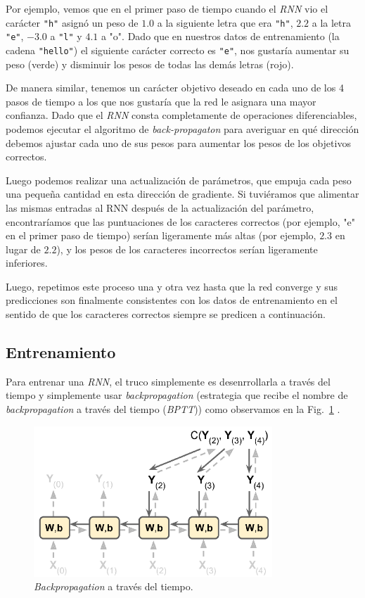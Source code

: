 \documentclass[a4paper,12pt]{article}
\begin{document}
Por ejemplo, vemos que en el primer paso de tiempo cuando el \textit{RNN} vio el carácter \texttt{"h"} asignó un peso de $1.0$ a la siguiente letra que era \texttt{"h"}, $2.2$ a la letra \texttt{"e"}, $-3.0$ a \texttt{"l"} y $4.1$ a "o". Dado que en nuestros datos de entrenamiento (la cadena \texttt{"hello"}) el siguiente carácter correcto es \texttt{"e"}, nos gustaría aumentar su peso (verde) y disminuir los pesos de todas las demás letras (rojo). 

De manera similar, tenemos un carácter objetivo deseado en cada uno de los 4 pasos de tiempo a los que nos gustaría que la red le asignara una mayor confianza. Dado que el \textit{RNN} consta completamente de operaciones diferenciables, podemos ejecutar el algoritmo de \textit{back-propagaton} para averiguar en qué dirección debemos ajustar cada uno de sus pesos para aumentar los pesos de los objetivos correctos. 

Luego podemos realizar una actualización de parámetros, que empuja cada peso una pequeña cantidad en esta dirección de gradiente. Si tuviéramos que alimentar las mismas entradas al RNN después de la actualización del parámetro, encontraríamos que las puntuaciones de los caracteres correctos (por ejemplo, "e" en el primer paso de tiempo) serían ligeramente más altas (por ejemplo, $2.3$ en lugar de $2.2$), y los pesos de los caracteres incorrectos serían ligeramente inferiores.

Luego, repetimos este proceso una y otra vez hasta que la red converge y sus predicciones son finalmente consistentes con los datos de entrenamiento en el sentido de que los caracteres correctos siempre se predicen a continuación.

\subsection{Entrenamiento}
Para entrenar una \textit{RNN}, el truco simplemente es desenrrollarla a través del tiempo y simplemente usar \textit{backpropagation} (estrategia que recibe el nombre de \textit{backpropagation} a través del tiempo (\textit{BPTT})) como observamos en la Fig.~\ref{fig:BPTT} \citep{geron}.

\begin{figure}[H]
	\begin{center}				
	\includegraphics[width=0.8\textwidth]{tesis_40.png}
  	\caption{\textit{Backpropagation} a través del tiempo.}
  	\label{fig:BPTT}
  	\end{center}
\end{figure}
\end{document}
